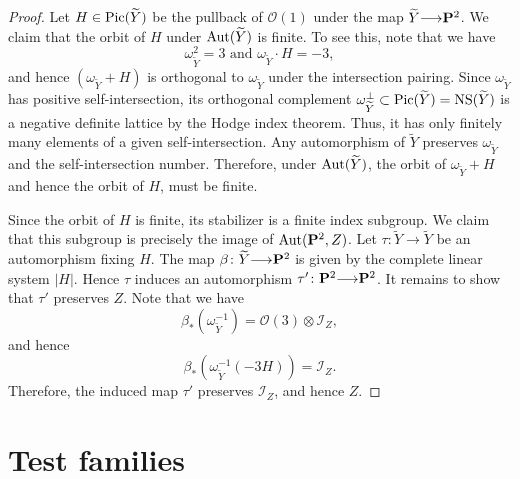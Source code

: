 \documentclass[11pt,reqno, letterpaper]{amsart}
\renewcommand{\to}{{\longrightarrow}}
\numberwithin{equation}{section}
\renewcommand{\O}{\mathcal O}
\begin{document}
\begin{proof}
  Let $H \in \operatorname{Pic}(\widetilde Y)$ be the pullback of $\O(1)$ under the map $\widetilde Y \to \P^2$.
  We claim that the orbit of $H$ under $\operatorname{Aut}(\widetilde Y)$ is finite.
  To see this, note that we have
  \[ \omega_{\widetilde Y}^2 = 3 \text{ and } \omega_{\widetilde Y} \cdot H = -3, \]
  and hence $(\omega_{\widetilde Y} + H)$ is orthogonal to $\omega_{\widetilde Y}$ under the intersection pairing.
  Since $\omega_{\widetilde Y}$ has positive self-intersection, its orthogonal complement $\omega_{\widetilde Y}^\perp \subset \operatorname{Pic}(\widetilde Y) = {\rm NS}(\widetilde Y)$ is a negative definite lattice by the Hodge index theorem.
  Thus, it has only finitely many elements of a given self-intersection.
  Any automorphism of $\widetilde Y$ preserves $\omega_{\widetilde Y}$ and the self-intersection number.
  Therefore, under $\operatorname{Aut}(\widetilde Y)$, the orbit of $\omega_{\widetilde Y} + H$ and hence the orbit of $H$, must be finite.

  Since the orbit of $H$ is finite, its stabilizer is a finite index subgroup.
  We claim that this subgroup is precisely the image of $\operatorname{Aut}({\bf P}^2, Z)$.
  Let $\tau \colon \widetilde Y \to \widetilde Y$ be an automorphism fixing $H$.
  The map $\beta \colon \widetilde Y \to \P^2$ is given by the complete linear system $|H|$.
  Hence $\tau$ induces an automorphism $\tau' \colon \P^2 \to \P^2$.
  It remains to show that $\tau'$ preserves $Z$.
  Note that we have
  \[ \beta_* \left(\omega_{\widetilde Y}^{-1}\right) = \O(3) \otimes \mathcal I_Z,\]
  and hence
  \[ \beta_* \left( \omega_{\widetilde Y}^{-1} (-3H) \right) = \mathcal I_Z.\]
  Therefore, the induced map $\tau'$ preserves $\mathcal I_Z$, and hence $Z$.
\end{proof}



\section{Test families}\label{sec:testfamilies}
\end{document}
